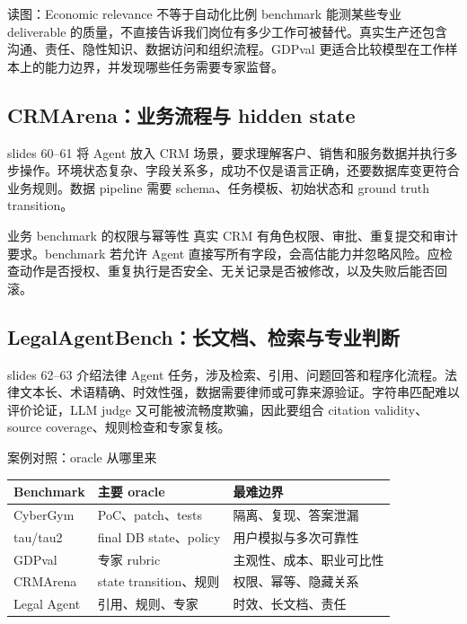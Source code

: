 \begin{knowledgebox}{读图：Economic relevance 不等于自动化比例}
benchmark 能测某些专业 deliverable 的质量，不直接告诉我们岗位有多少工作可被替代。真实生产还包含沟通、责任、隐性知识、数据访问和组织流程。GDPval 更适合比较模型在工作样本上的能力边界，并发现哪些任务需要专家监督。
\end{knowledgebox}

\subsection{CRMArena：业务流程与 hidden state}

slides 60--61 将 Agent 放入 CRM 场景，要求理解客户、销售和服务数据并执行多步操作。环境状态复杂、字段关系多，成功不仅是语言正确，还要数据库变更符合业务规则。数据 pipeline 需要 schema、任务模板、初始状态和 ground truth transition。


\begin{warningbox}{业务 benchmark 的权限与幂等性}
真实 CRM 有角色权限、审批、重复提交和审计要求。benchmark 若允许 Agent 直接写所有字段，会高估能力并忽略风险。应检查动作是否授权、重复执行是否安全、无关记录是否被修改，以及失败后能否回滚。
\end{warningbox}

\subsection{LegalAgentBench：长文档、检索与专业判断}

slides 62--63 介绍法律 Agent 任务，涉及检索、引用、问题回答和程序化流程。法律文本长、术语精确、时效性强，数据需要律师或可靠来源验证。字符串匹配难以评价论证，LLM judge 又可能被流畅度欺骗，因此要组合 citation validity、source coverage、规则检查和专家复核。


\begin{knowledgebox}{案例对照：oracle 从哪里来}
\begin{tabular}{p{2.5cm}p{3.9cm}p{4.7cm}}
\toprule
\textbf{Benchmark} & \textbf{主要 oracle} & \textbf{最难边界} \\
\midrule
CyberGym & PoC、patch、tests & 隔离、复现、答案泄漏 \\
tau/tau2 & final DB state、policy & 用户模拟与多次可靠性 \\
GDPval & 专家 rubric & 主观性、成本、职业可比性 \\
CRMArena & state transition、规则 & 权限、幂等、隐藏关系 \\
Legal Agent & 引用、规则、专家 & 时效、长文档、责任 \\
\bottomrule
\end{tabular}
\end{knowledgebox}


